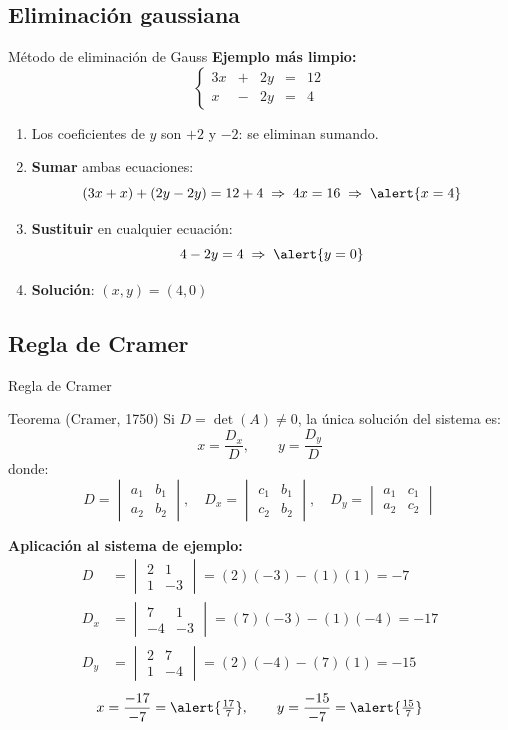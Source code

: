 \documentclass[11pt, aspectratio=169]{beamer}
\newcommand{\deter}[4]{\begin{vmatrix} #1 & #2 \\ #3 & #4 \end{vmatrix}}
\begin{document}
	\subsection{Eliminación gaussiana}
	
	\begin{frame}{Método de eliminación de Gauss}
		\textbf{Ejemplo más limpio:}
		\[
		\left\{
		\begin{array}{rcrcr}
			3x & + & 2y & = & 12 \\[4pt]
			x & - & 2y & = &  4
		\end{array}
		\right.
		\]
		
		\begin{enumerate}
			\item<1-> Los coeficientes de $y$ son $+2$ y $-2$: se eliminan sumando.
			
			\item<2-> \textbf{Sumar} ambas ecuaciones:
			\[ (3x + x) + (2y - 2y) = 12 + 4 \;\Rightarrow\; 4x = 16 \;\Rightarrow\; \alert{x = 4} \]
			
			\item<3-> \textbf{Sustituir} en cualquier ecuación:
			\[ 4 - 2y = 4 \;\Rightarrow\; \alert{y = 0} \]
			
			\item<4-> \textbf{Solución}: $(x, y) = (4, 0)$
		\end{enumerate}
		
		\vspace{0.4em}
	\end{frame}
	
	\subsection{Regla de Cramer}
	
	\begin{frame}{Regla de Cramer}
		\begin{block}{Teorema (Cramer, 1750)}
			Si $D = \det(A) \neq 0$, la única solución del sistema es:
			\[
			x = \frac{D_x}{D}, \qquad y = \frac{D_y}{D}
			\]
			donde:
			\[
			D = \deter{a_1}{b_1}{a_2}{b_2}, \quad
			D_x = \deter{c_1}{b_1}{c_2}{b_2}, \quad
			D_y = \deter{a_1}{c_1}{a_2}{c_2}
			\]
		\end{block}
		
		\pause
		\textbf{Aplicación al sistema de ejemplo:}
		\begin{align*}
			D   &= \deter{2}{1}{1}{-3} = (2)(-3)-(1)(1) = -7 \\[4pt]
			D_x &= \deter{7}{1}{-4}{-3} = (7)(-3)-(1)(-4) = -17 \\[4pt]
			D_y &= \deter{2}{7}{1}{-4} = (2)(-4)-(7)(1) = -15
		\end{align*}
		\pause
		\[
		x = \frac{-17}{-7} = \alert{\tfrac{17}{7}}, \qquad
		y = \frac{-15}{-7} = \alert{\tfrac{15}{7}}
		\]
	\end{frame}
	
\end{document}
